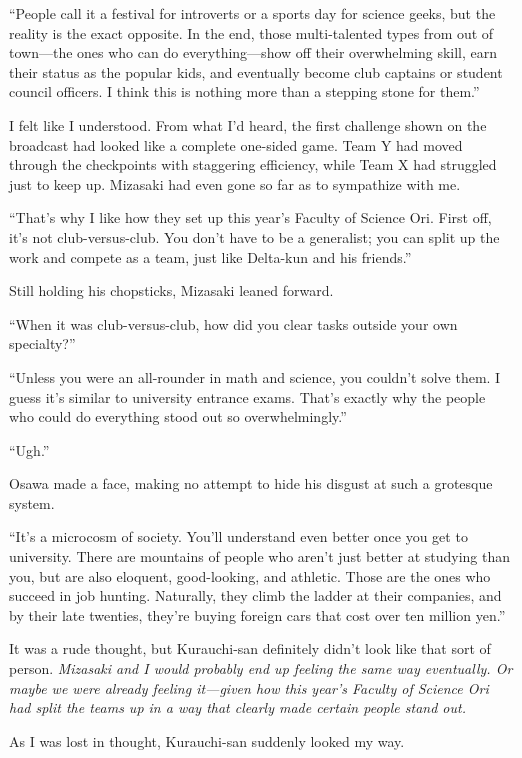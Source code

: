 \documentclass[
    a4paper,
    12pt,
    twoside,
    openany,
    UTF8,
    fontset=windows
]{ctexbook}
\begin{document}
``People call it a festival for introverts or a sports day for science geeks, but the reality is the exact opposite. In the end, those multi-talented types from out of town---the ones who can do everything---show off their overwhelming skill, earn their status as the popular kids, and eventually become club captains or student council officers. I think this is nothing more than a stepping stone for them.''

I felt like I understood. From what I'd heard, the first challenge shown on the broadcast had looked like a complete one-sided game. Team Y had moved through the checkpoints with staggering efficiency, while Team X had struggled just to keep up. Mizasaki had even gone so far as to sympathize with me.

``That's why I like how they set up this year's Faculty of Science Ori. First off, it's not club-versus-club. You don't have to be a generalist; you can split up the work and compete as a team, just like Delta-kun and his friends.''

Still holding his chopsticks, Mizasaki leaned forward.

``When it was club-versus-club, how did you clear tasks outside your own specialty?''

``Unless you were an all-rounder in math and science, you couldn't solve them. I guess it's similar to university entrance exams. That's exactly why the people who could do everything stood out so overwhelmingly.''

``Ugh.''

Osawa made a face, making no attempt to hide his disgust at such a grotesque system.

``It's a microcosm of society. You'll understand even better once you get to university. There are mountains of people who aren't just better at studying than you, but are also eloquent, good-looking, and athletic. Those are the ones who succeed in job hunting. Naturally, they climb the ladder at their companies, and by their late twenties, they're buying foreign cars that cost over ten million yen.''

It was a rude thought, but Kurauchi-san definitely didn't look like that sort of person. \textit{Mizasaki and I would probably end up feeling the same way eventually. Or maybe we were already feeling it---given how this year's Faculty of Science Ori had split the teams up in a way that clearly made certain people stand out.}

As I was lost in thought, Kurauchi-san suddenly looked my way.
\end{document}
